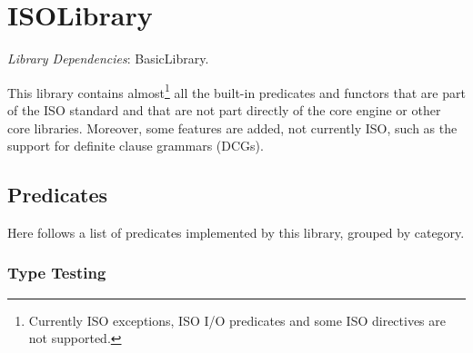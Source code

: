 \clearpage

\section{ISOLibrary}

\noindent \emph{Library Dependencies}: BasicLibrary.

This library contains almost\footnote{Currently ISO exceptions, ISO
I/O predicates and some ISO directives are not supported.} all the
built-in predicates and functors that are part of the ISO standard
and that are not part directly of the \tuprolog{} core engine or
other core libraries.
%
Moreover, some features are added, not currently ISO, such as the
support for definite clause grammars (DCGs).
%

\subsection{Predicates}

\noindent Here follows a list of predicates implemented by this
library, grouped by category.


%
%

\subsubsection{Type Testing}

